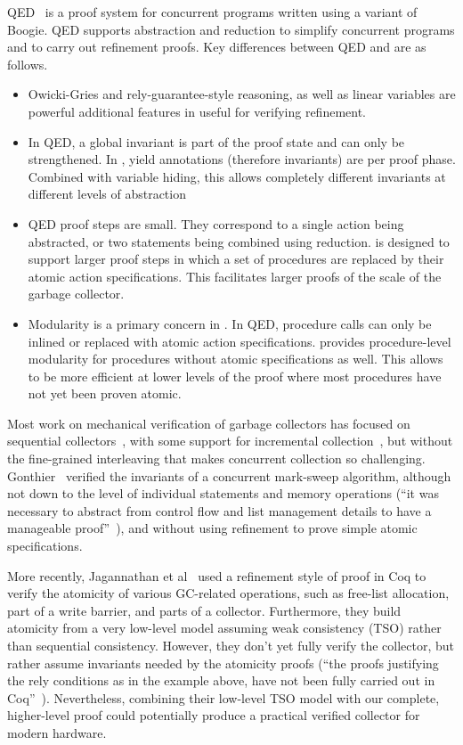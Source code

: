 QED~\cite{ElmasQT09} is a proof system for concurrent programs written using a variant of Boogie. QED supports abstraction and reduction to simplify concurrent programs and to carry out refinement proofs. Key differences between QED and \civl are as follows.
\begin{itemize}
\item Owicki-Gries and rely-guarantee-style reasoning, as well as linear variables are powerful additional features in \civl useful for verifying refinement. 
\item In QED, a global invariant is part of the proof state and can only be strengthened. In \civl, yield annotations (therefore invariants) are per proof phase. Combined with variable hiding, this allows completely different invariants at different levels of abstraction
\item QED proof steps are small. They correspond to a single action being abstracted, or two statements being combined using reduction. \civl is designed to support larger proof steps in which a set of procedures are replaced by their atomic action specifications. This facilitates larger proofs of the scale of the garbage collector.  
\item Modularity is a primary concern in \civl. In QED, procedure calls can only be inlined or replaced with atomic action specifications. \civl provides procedure-level modularity for procedures without atomic specifications as well. This allows \civl to be more efficient at lower levels of the proof where most procedures have not yet been proven atomic. 
\end{itemize}

Most work on mechanical verification of garbage collectors has focused on sequential collectors~\cite{mccr07,hawb09},
with some support for incremental collection~\cite{mccr07},
but without the fine-grained interleaving that makes concurrent collection so challenging.
Gonthier~\cite{gont96} verified the invariants of a concurrent mark-sweep algorithm,
although not down to the level of individual statements and memory operations
(``it was necessary to abstract from control flow and list management details to have a manageable proof''~\cite{gont96}),
and without using refinement to prove simple atomic specifications.

More recently,
Jagannathan et al~\cite{Jagannathan14} used a refinement style of proof in Coq to verify the atomicity of various GC-related operations,
such as free-list allocation,
part of a write barrier, and parts of a collector.
Furthermore, they build atomicity from a very low-level model assuming weak consistency (TSO) rather than sequential consistency.
However, they don't yet fully verify the collector,
but rather assume invariants needed by the atomicity proofs
(``the proofs justifying the rely conditions as in the example above,
have not been fully carried out in Coq''~\cite{Jagannathan14}).
Nevertheless, combining their low-level TSO model with our complete,
higher-level proof could potentially produce a practical verified collector for modern hardware.

